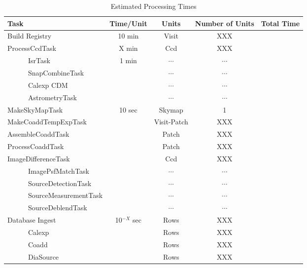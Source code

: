 \documentclass[12pt]{article}
\begin{document}
\begin{table*}[h]
\small
\begin{center}
\caption{\label{tab-pars} Estimated Processing Times}
\begin{tabular}{lcccc}
\hline \hline
Task                          & Time/Unit     & Units        & Number of Units & Total Time\\
\hline
Build Registry                & 10 min        & Visit        & XXX             &           \\ 
ProcessCcdTask                & X min         & Ccd          & XXX             &           \\ %
~~~~~~IsrTask                 & 1 min         & $\cdots$     & $\cdots$        &           \\
~~~~~~SnapCombineTask         &               & $\cdots$     & $\cdots$        &           \\
~~~~~~Calexp CDM              &               & $\cdots$     & $\cdots$        &           \\
~~~~~~AstrometryTask          &               & $\cdots$     & $\cdots$        &           \\
MakeSkyMapTask                & 10 sec        & Skymap       & 1               &           \\
MakeCoaddTempExpTask          &               & Visit-Patch  & XXX             &           \\
AssembleCoaddTask             &               & Patch        & XXX             &           \\   
ProcessCoaddTask              &               & Patch        & XXX             &           \\
ImageDifferenceTask           &               & Ccd          & XXX             &           \\
~~~~~~ImagePsfMatchTask       &               & $\cdots$     & $\cdots$        &           \\
~~~~~~SourceDetectionTask     &               & $\cdots$     & $\cdots$        &           \\
~~~~~~SourceMeasurementTask   &               & $\cdots$     & $\cdots$        &           \\
~~~~~~SourceDeblendTask       &               & $\cdots$     & $\cdots$        &           \\
\hline
Database Ingest               & 10$^{-X}$ sec & Rows         & XXX             &           \\
~~~~~~Calexp                  &               & Rows         & XXX             &           \\
~~~~~~Coadd                   &               & Rows         & XXX             &           \\
~~~~~~DiaSource               &               & Rows         & XXX             &           \\
\hline
\hline
\end{tabular}
\end{center}
\end{table*}
\end{document}
